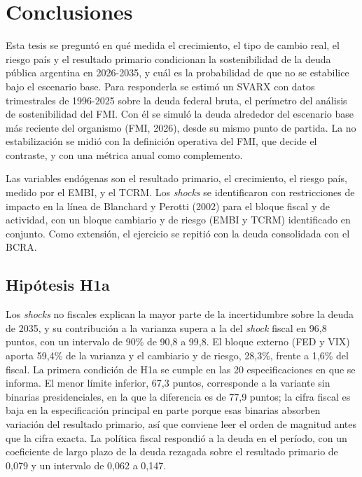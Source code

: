 \chapter{Conclusiones}

Esta tesis se preguntó en qué medida el crecimiento, el tipo de cambio
real, el riesgo país y el resultado primario condicionan la
sostenibilidad de la deuda pública argentina en 2026-2035, y cuál es la
probabilidad de que no se estabilice bajo el escenario base. Para
responderla se estimó un SVARX con datos trimestrales de 1996-2025 sobre
la deuda federal bruta, el perímetro del análisis de sostenibilidad del
FMI. Con él se simuló la deuda alrededor del escenario base más reciente
del organismo (FMI, 2026), desde su mismo punto de partida. La no
estabilización se midió con la definición operativa del FMI, que decide
el contraste, y con una métrica anual como complemento.

Las variables endógenas son el resultado primario, el crecimiento, el
riesgo país, medido por el EMBI, y el TCRM. Los \emph{shocks} se
identificaron con restricciones de impacto en la línea de Blanchard y
Perotti (2002) para el bloque fiscal y de actividad, con un bloque
cambiario y de riesgo (EMBI y TCRM) identificado en conjunto. Como
extensión, el ejercicio se repitió con la deuda consolidada con el BCRA.

\section{Hipótesis H1a}

Los \emph{shocks} no fiscales explican la mayor parte de la
incertidumbre sobre la deuda de 2035, y su contribución a la varianza
supera a la del \emph{shock} fiscal en 96,8 puntos, con un intervalo de
90\% de 90,8 a 99,8. El bloque externo (FED y VIX) aporta 59,4\% de la
varianza y el cambiario y de riesgo, 28,3\%, frente a 1,6\% del fiscal.
La primera condición de H1a se cumple en las 20 especificaciones en que
se informa. El menor límite inferior, 67,3 puntos, corresponde a la
variante sin binarias presidenciales, en la que la diferencia es de 77,9
puntos; la cifra fiscal es baja en la especificación principal en parte
porque esas binarias absorben variación del resultado primario, así que
conviene leer el orden de magnitud antes que la cifra exacta. La
política fiscal respondió a la deuda en el período, con un coeficiente
de largo plazo de la deuda rezagada sobre el resultado primario de 0,079
y un intervalo de 0,062 a 0,147.

